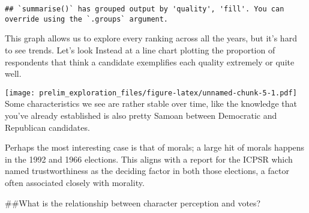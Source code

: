 \documentclass[
]{article}
\newenvironment{Shaded}{\begin{snugshade}}{\end{snugshade}}
\newcommand{\DataTypeTok}[1]{\textcolor[rgb]{0.13,0.29,0.53}{#1}}
\newcommand{\DecValTok}[1]{\textcolor[rgb]{0.00,0.00,0.81}{#1}}
\newcommand{\KeywordTok}[1]{\textcolor[rgb]{0.13,0.29,0.53}{\textbf{#1}}}
\newcommand{\NormalTok}[1]{#1}
\newcommand{\OperatorTok}[1]{\textcolor[rgb]{0.81,0.36,0.00}{\textbf{#1}}}
\newcommand{\StringTok}[1]{\textcolor[rgb]{0.31,0.60,0.02}{#1}}
\begin{document}
\begin{verbatim}
## `summarise()` has grouped output by 'quality', 'fill'. You can override using the `.groups` argument.
\end{verbatim}

This graph allows us to explore every ranking across all the years, but
it's hard to see trends. Let's look Instead at a line chart plotting the
proportion of respondents that think a candidate exemplifies each
quality extremely or quite well.

\begin{Shaded}
\end{Shaded}

\texttt{[image: prelim\_exploration\_files/figure-latex/unnamed-chunk-5-1.pdf]}
Some characteristics we see are rather stable over time, like the
knowledge that you've already established is also pretty Samoan between
Democratic and Republican candidates.

Perhaps the most interesting case is that of morals; a large hit of
morals happens in the 1992 and 1966 elections. This aligns with a report
for the ICPSR which named trustworthiness as the deciding factor in both
those elections, a factor often associated closely with morality.

\#\#What is the relationship between character perception and votes?
\end{document}
